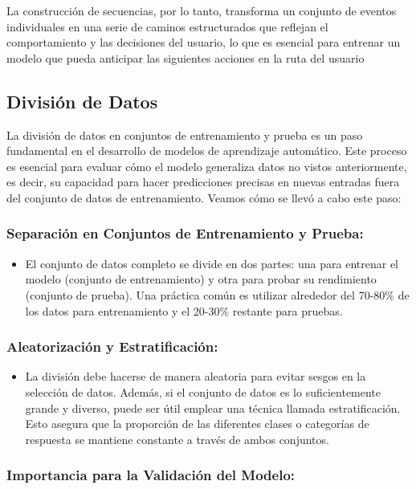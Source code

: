 La construcción de secuencias, por lo tanto, transforma un conjunto de eventos individuales en una serie de caminos estructurados que reflejan el comportamiento y las decisiones del usuario, lo que es esencial para entrenar un modelo que pueda anticipar las siguientes acciones en la ruta del usuario

\subsection{División de Datos}

La división de datos en conjuntos de entrenamiento y prueba es un paso fundamental en el desarrollo de modelos de aprendizaje automático. Este proceso es esencial para evaluar cómo el modelo generaliza datos no vistos anteriormente, es decir, su capacidad para hacer predicciones precisas en nuevas entradas fuera del conjunto de datos de entrenamiento. Veamos cómo se llevó a cabo este paso:

\subsubsection{Separación en Conjuntos de Entrenamiento y Prueba:}

\begin{itemize}
    \item El conjunto de datos completo se divide en dos partes: una para entrenar el modelo (conjunto de entrenamiento) y otra para probar su rendimiento (conjunto de prueba). Una práctica común es utilizar alrededor del 70-80\% de los datos para entrenamiento y el 20-30\% restante para pruebas.
\end{itemize}

\subsubsection{Aleatorización y Estratificación:}

\begin{itemize}
    \item La división debe hacerse de manera aleatoria para evitar sesgos en la selección de datos. Además, si el conjunto de datos es lo suficientemente grande y diverso, puede ser útil emplear una técnica llamada estratificación. Esto asegura que la proporción de las diferentes clases o categorías de respuesta se mantiene constante a través de ambos conjuntos.
\end{itemize}

\subsubsection{Importancia para la Validación del Modelo:}


